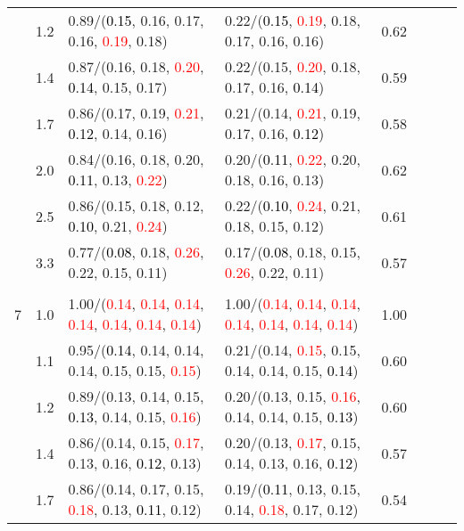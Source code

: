 \documentclass[10pt,a4paper]{report}
\begin{document}
\begin{table}[!htbp]
\begin{center}
{\begin{tabular}{ccllcccc}
			&1.2&0.89/(\textcolor{black}{0.15}, 0.16, 0.17, 0.16, \textcolor{red}{0.19}, 0.18)&0.22/(\textcolor{black}{0.15}, \textcolor{red}{0.19}, 0.18, 0.17, 0.16, 0.16)&0.62\\
			&1.4&0.87/(0.16, 0.18, \textcolor{red}{0.20}, \textcolor{black}{0.14}, 0.15, 0.17)&0.22/(0.15, \textcolor{red}{0.20}, 0.18, 0.17, 0.16, \textcolor{black}{0.14})&0.59\\
			&1.7&0.86/(0.17, 0.19, \textcolor{red}{0.21}, \textcolor{black}{0.12}, 0.14, 0.16)&0.21/(0.14, \textcolor{red}{0.21}, 0.19, 0.17, 0.16, \textcolor{black}{0.12})&0.58\\
			&2.0&0.84/(0.16, 0.18, 0.20, \textcolor{black}{0.11}, 0.13, \textcolor{red}{0.22})&0.20/(\textcolor{black}{0.11}, \textcolor{red}{0.22}, 0.20, 0.18, 0.16, 0.13)&0.62\\
			&2.5&0.86/(0.15, 0.18, 0.12, \textcolor{black}{0.10}, 0.21, \textcolor{red}{0.24})&0.22/(\textcolor{black}{0.10}, \textcolor{red}{0.24}, 0.21, 0.18, 0.15, 0.12)&0.61\\
			&3.3&0.77/(\textcolor{black}{0.08}, 0.18, \textcolor{red}{0.26}, 0.22, 0.15, 0.11)&0.17/(\textcolor{black}{0.08}, 0.18, 0.15, \textcolor{red}{0.26}, 0.22, 0.11)&0.57\\
			&&&&\\
			7			&1.0&1.00/(\textcolor{red}{0.14}, \textcolor{red}{0.14}, \textcolor{red}{0.14}, \textcolor{red}{0.14}, \textcolor{red}{0.14}, \textcolor{red}{0.14}, \textcolor{red}{0.14})&1.00/(\textcolor{red}{0.14}, \textcolor{red}{0.14}, \textcolor{red}{0.14}, \textcolor{red}{0.14}, \textcolor{red}{0.14}, \textcolor{red}{0.14}, \textcolor{red}{0.14})&1.00\\
			&1.1&0.95/(\textcolor{black}{0.14}, 0.14, 0.14, 0.14, 0.15, 0.15, \textcolor{red}{0.15})&0.21/(0.14, \textcolor{red}{0.15}, 0.15, 0.14, 0.14, 0.15, \textcolor{black}{0.14})&0.60\\
			&1.2&0.89/(0.13, 0.14, 0.15, \textcolor{black}{0.13}, 0.14, 0.15, \textcolor{red}{0.16})&0.20/(0.13, 0.15, \textcolor{red}{0.16}, 0.14, 0.14, 0.15, \textcolor{black}{0.13})&0.60\\
			&1.4&0.86/(0.14, 0.15, \textcolor{red}{0.17}, 0.13, 0.16, \textcolor{black}{0.12}, 0.13)&0.20/(0.13, \textcolor{red}{0.17}, 0.15, 0.14, 0.13, 0.16, \textcolor{black}{0.12})&0.57\\
			&1.7&0.86/(0.14, 0.17, 0.15, \textcolor{red}{0.18}, 0.13, \textcolor{black}{0.11}, 0.12)&0.19/(\textcolor{black}{0.11}, 0.13, 0.15, 0.14, \textcolor{red}{0.18}, 0.17, 0.12)&0.54\\

\end{tabular}}
\end{center}
\end{table}
\end{document}
